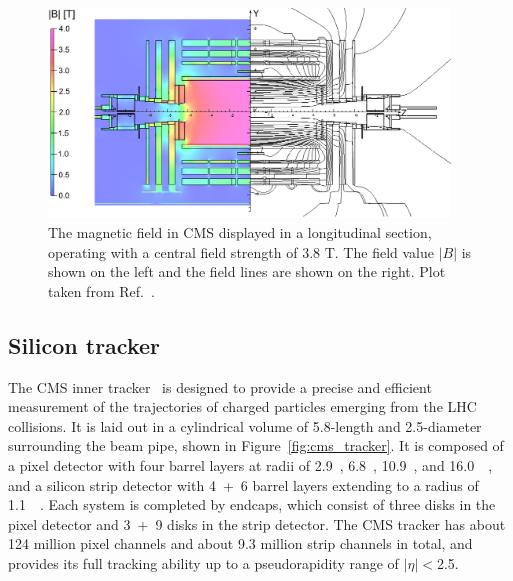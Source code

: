 \begin{figure}[!htb]
    \centering
    \captionsetup{justification=justified}
    \includegraphics[width=0.95\textwidth]{pics/LHC_CMS/CMS_field.png}
    \caption{The magnetic field in CMS displayed in a longitudinal section, operating with a central field strength of 3.8 T.
             The field value $|B|$ is shown on the left and the field lines are shown on the right.
             Plot taken from Ref.~\cite{Collaboration_2010}. }
    \label{fig:cms_field}
\end{figure}


\subsection{Silicon tracker}\label{sec:tracker}

The CMS inner tracker~\cite{Collaboration_2008, phase1_tracker} is designed to provide a precise and efficient measurement of the trajectories of charged particles emerging from the LHC collisions.
It is laid out in a cylindrical volume of 5.8-\meter length and 2.5-\meter diameter surrounding the beam pipe, shown in Figure~\ref{fig:cms_tracker}.
It is composed of a pixel detector with four barrel layers at radii of 2.9~\cm, 6.8~\cm, 10.9~\cm, and 16.0~\cm~\cite{phase1_tracker},
and a silicon strip detector with 4~+~6 barrel layers extending to a radius of 1.1~\meter~\cite{Collaboration_2008}.
Each system is completed by endcaps, which consist of three disks in the pixel detector and 3~+~9 disks in the strip detector.
The CMS tracker has about 124 million pixel channels and about 9.3 million strip channels in total,
and provides its full tracking ability up to a pseudorapidity range of $|\eta| < $2.5.

